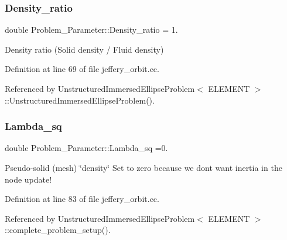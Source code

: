 \mbox{\label{namespaceProblem__Parameter_a7fcb9a415485247d626190923235be2a}} 
\subsubsection{\texorpdfstring{Density\+\_\+ratio}{Density\_ratio}}
{\footnotesize\ttfamily double Problem\+\_\+\+Parameter\+::\+Density\+\_\+ratio = 1.}



Density ratio (Solid density / Fluid density) 



Definition at line 69 of file jeffery\+\_\+orbit.\+cc.



Referenced by Unstructured\+Immersed\+Ellipse\+Problem$<$ E\+L\+E\+M\+E\+N\+T $>$\+::\+Unstructured\+Immersed\+Ellipse\+Problem().

\mbox{\label{namespaceProblem__Parameter_a20ea33c391abd96d43f79913377c1e12}} 
\subsubsection{\texorpdfstring{Lambda\+\_\+sq}{Lambda\_sq}}
{\footnotesize\ttfamily double Problem\+\_\+\+Parameter\+::\+Lambda\+\_\+sq =0.}



Pseudo-\/solid (mesh) \char`\"{}density\char`\"{} Set to zero because we don\textquotesingle{}t want inertia in the node update! 



Definition at line 83 of file jeffery\+\_\+orbit.\+cc.



Referenced by Unstructured\+Immersed\+Ellipse\+Problem$<$ E\+L\+E\+M\+E\+N\+T $>$\+::complete\+\_\+problem\+\_\+setup().

\mbox{\label{namespaceProblem__Parameter_abec2e733c8f2d3c18ebc702b3f80cc17}} 
